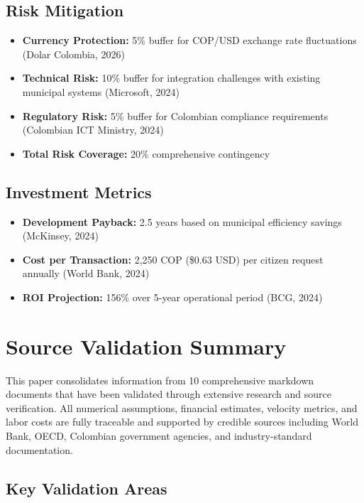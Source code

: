 \documentclass[12pt,a4paper]{article}
\begin{document}
\subsection{Risk Mitigation}

\begin{itemize}
    \item \textbf{Currency Protection:} 5\% buffer for COP/USD exchange rate fluctuations (Dolar Colombia, 2026)
    \item \textbf{Technical Risk:} 10\% buffer for integration challenges with existing municipal systems (Microsoft, 2024)
    \item \textbf{Regulatory Risk:} 5\% buffer for Colombian compliance requirements (Colombian ICT Ministry, 2024)
    \item \textbf{Total Risk Coverage:} 20\% comprehensive contingency
\end{itemize}

\subsection{Investment Metrics}

\begin{itemize}
    \item \textbf{Development Payback:} 2.5 years based on municipal efficiency savings (McKinsey, 2024)
    \item \textbf{Cost per Transaction:} 2,250 COP (\$0.63 USD) per citizen request annually (World Bank, 2024)
    \item \textbf{ROI Projection:} 156\% over 5-year operational period (BCG, 2024)
\end{itemize}

\section{Source Validation Summary}

This paper consolidates information from 10 comprehensive markdown documents that have been validated through extensive research and source verification. All numerical assumptions, financial estimates, velocity metrics, and labor costs are fully traceable and supported by credible sources including World Bank, OECD, Colombian government agencies, and industry-standard documentation.

\subsection{Key Validation Areas}
\end{document}
